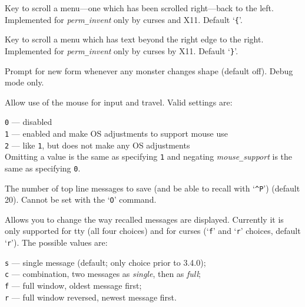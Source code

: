 \item[\ib{menu\verb+_+shift\verb+_+left}]
Key to scroll a menu---one which has been
scrolled right---back to the left.
Implemented for {\it perm\verb+_+invent\/} only by curses and X11.
Default `{\tt \verb+{+}'.

\item[\ib{menu\verb+_+shift\verb+_+right}]
Key to scroll a menu which has text beyond the
right edge to the right.
Implemented for {\it perm\verb+_+invent\/} only by curses by X11.
Default `{\tt \verb+}+}'.
\item[\ib{monpolycontrol}]
Prompt for new form whenever any monster changes shape (default off).
Debug mode only.
\item[\ib{mouse\verb+_+support}]
Allow use of the mouse for input and travel.
Valid settings are:

{\tt 0} --- disabled\\
{\tt 1} --- enabled and make OS adjustments to support mouse use\\
{\tt 2} --- like {\tt 1}, but does not make any OS adjustments\\

Omitting a value is the same as specifying {\tt 1}
and negating
{\it mouse\verb+_+support\/}
is the same as specifying {\tt 0}.
\item[\ib{msghistory}]
The number of top line messages to save (and be able to recall
with `{\tt \^{}P}') (default 20).
Cannot be set with the `{\tt O}' command.
\item[\ib{msg\verb+_+window}]
Allows you to change the way recalled messages are displayed.
Currently it is only supported for tty (all four choices) and for curses
(`{\tt f}' and `{\tt r}' choices, default `{\tt r}').
The possible values are:

{\tt s} --- single message (default; only choice prior to 3.4.0);\\
{\tt c} --- combination, two messages as {\it single\/}, then as {\it full\/};\\
{\tt f} --- full window, oldest message first;\\
{\tt r} --- full window reversed, newest message first.


